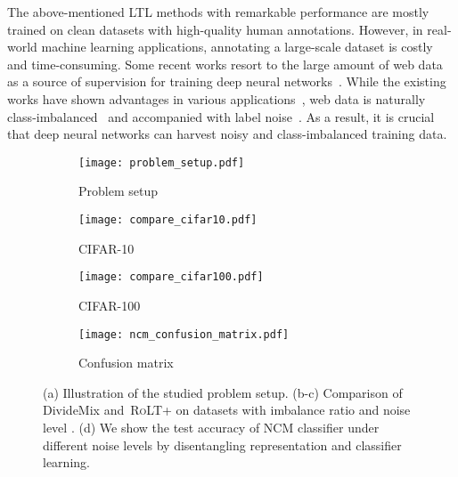 \documentclass{article}
\def\algo{{\textsc{RoLT}}}
\begin{document}
The above-mentioned LTL methods with remarkable performance are mostly trained on clean datasets with high-quality human annotations. However, in real-world machine learning applications, annotating a large-scale dataset is costly and time-consuming. Some recent works resort to the large amount of web data as a source of supervision for training deep neural networks~\cite{webvision}. While the existing works have shown advantages in various applications~\cite{DBLP:conf/eccv/LiNX14,ma2018dimensionality}, web data is naturally class-imbalanced~\cite{li2020dividemix,li2021mopro} and accompanied with label noise~\cite{xu2019l_dmi,li2020dividemix,yao2020dualt,xia2021robust}. As a result, it is crucial that deep neural networks can harvest noisy and class-imbalanced training data. 


\begin{figure}[t]
    \centering
    \begin{subfigure}[b]{0.268\textwidth}
        \centering
        \texttt{[image: problem\_setup.pdf]}
        \caption{Problem setup} \label{fig:problem_setup}
    \end{subfigure}
    \begin{subfigure}[b]{0.244\textwidth}
        \centering
        \texttt{[image: compare\_cifar10.pdf]}
        \caption{CIFAR-10} \label{fig:dividemix_cifar10}
    \end{subfigure}
    \begin{subfigure}[b]{0.244\textwidth}
        \centering
        \texttt{[image: compare\_cifar100.pdf]}
        \caption{CIFAR-100} \label{fig:dividemix_cifar100}
    \end{subfigure}
    \begin{subfigure}[b]{0.223\textwidth}
        \centering
        \texttt{[image: ncm\_confusion\_matrix.pdf]}
        \caption{Confusion matrix} \label{fig:ncm_confusion_matrix}
    \end{subfigure}
    \caption{(a) Illustration of the studied problem setup. (b-c) Comparison of DivideMix and~\algo+ on  datasets with imbalance ratio  and noise level . (d) We show the test accuracy of NCM classifier under different noise levels by disentangling representation and classifier learning.} \end{figure}
\end{document}
